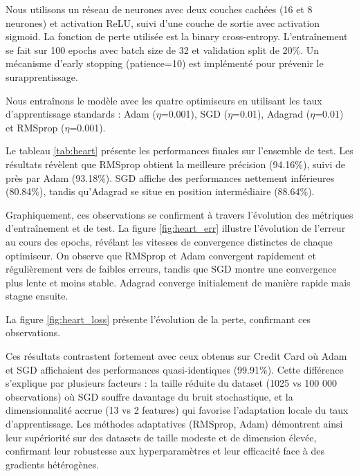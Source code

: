 \documentclass[a4paper,12pt]{article}
\begin{document}
Nous utilisons un réseau de neurones avec deux couches cachées (16 et 8 neurones) et activation ReLU, suivi d'une couche de sortie avec activation sigmoid. La fonction de perte utilisée est la binary cross-entropy. L'entraînement se fait sur 100 epochs avec batch size de 32 et validation split de 20\%. Un mécanisme d'early stopping (patience=10) est implémenté pour prévenir le surapprentissage.

Nous entraînons le modèle avec les quatre optimiseurs en utilisant les taux d'apprentissage standards : Adam ($\eta$=0.001), SGD ($\eta$=0.01), Adagrad ($\eta$=0.01) et RMSprop ($\eta$=0.001). \\

\par Le tableau \ref{tab:heart} présente les performances finales sur l'ensemble de test. Les résultats révèlent que RMSprop obtient la meilleure précision (94.16\%), suivi de près par Adam (93.18\%). SGD affiche des performances nettement inférieures (80.84\%), tandis qu'Adagrad se situe en position intermédiaire (88.64\%). \\

\par Graphiquement, ces observations se confirment à travers l'évolution des métriques d'entraînement et de test. La figure \ref{fig:heart_err} illustre l'évolution de l'erreur au cours des epochs, révélant les vitesses de convergence distinctes de chaque optimiseur. On observe que RMSprop et Adam convergent rapidement et régulièrement vers de faibles erreurs, tandis que SGD montre une convergence plus lente et moins stable. Adagrad converge initialement de manière rapide mais stagne ensuite. \\

\par La figure \ref{fig:heart_loss} présente l'évolution de la perte, confirmant ces observations.

\par Ces résultats contrastent fortement avec ceux obtenus sur Credit Card où Adam et SGD affichaient des performances quasi-identiques (99.91\%). Cette différence s'explique par plusieurs facteurs : la taille réduite du dataset (1025 vs 100 000 observations) où SGD souffre davantage du bruit stochastique, et la dimensionnalité accrue (13 vs 2 features) qui favorise l'adaptation locale du taux d'apprentissage. Les méthodes adaptatives (RMSprop, Adam) démontrent ainsi leur supériorité sur des datasets de taille modeste et de dimension élevée, confirmant leur robustesse aux hyperparamètres et leur efficacité face à des gradients hétérogènes.
\end{document}
